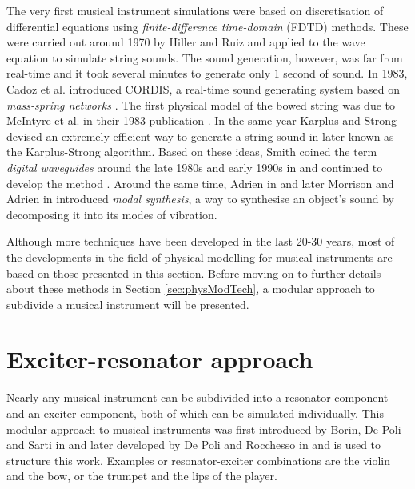 The very first musical instrument simulations were based on discretisation of differential equations using \textit{finite-difference time-domain} (FDTD) methods. These were carried out around 1970 by Hiller and Ruiz \cite{Ruiz1969, Hiller1971I, Hiller1971II} and applied to the wave equation to simulate string sounds. The sound generation, however, was far from real-time and it took several minutes to generate only $1$ second of sound. In 1983, Cadoz et al. introduced CORDIS, a real-time sound generating system based on \textit{mass-spring networks} \cite{Cadoz1983}.
The first physical model of the bowed string was due to McIntyre et al. in their 1983 publication \cite{McIntyre1983}. In the same year Karplus and Strong devised an extremely efficient way to generate a string sound in \cite{Karplus1983} later known as the Karplus-Strong algorithm. Based on these ideas, Smith coined the term \textit{digital waveguides} around the late 1980s and early 1990s in \cite{Smith1987, Smith1992} and continued to develop the method \cite{Smith2010b}.
Around the same time, Adrien in \cite{Adrien1991} and later Morrison and Adrien in \cite{Morrison1993} introduced \textit{modal synthesis}, a way to synthesise an object's sound by decomposing it into its modes of vibration. 

Although more techniques have been developed in the last 20-30 years, most of the developments in the field of physical modelling for musical instruments are based on those presented in this section. Before moving on to further details about these methods in Section \ref{sec:physModTech}, a modular approach to subdivide a musical instrument will be presented.

\section{Exciter-resonator approach}\label{sec:exciterResonator}
Nearly any musical instrument can be subdivided into a resonator component and an exciter component, both of which can be simulated individually. This modular approach to musical instruments was first introduced by Borin, De Poli and Sarti in \cite{Borin1989} and later developed by De Poli and Rocchesso in \cite{Poli1998} and is used to structure this work. Examples or resonator-exciter combinations are the violin and the bow, or the trumpet and the lips of the player. %

